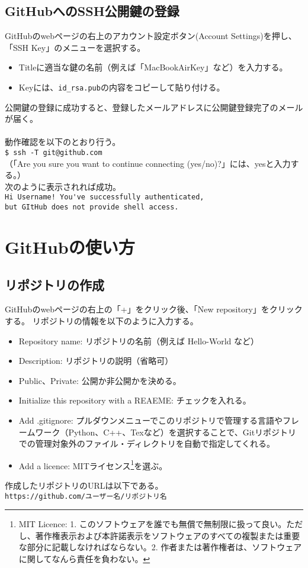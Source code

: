 \documentclass[11pt, oneside]{article}   	%
\begin{document}
\subsection{GitHubへのSSH公開鍵の登録}
GitHubのwebページの右上のアカウント設定ボタン(Account Settings)を押し、「SSH Key」のメニューを選択する。
\begin {itemize}
\item Titleに適当な鍵の名前（例えば「MacBookAirKey」など）を入力する。
\item Keyには、\verb|id_rsa.pub|の内容をコピーして貼り付ける。
\end{itemize}
公開鍵の登録に成功すると、登録したメールアドレスに公開鍵登録完了のメールが届く。\\ \\
動作確認を以下のとおり行う。\\ 
\verb|$ ssh -T git@github.com|\\
（「Are you sure you want to continue connecting (yes/no)?」には、yesと入力する。）\\
次のように表示されれば成功。\\
\verb|Hi Username! You've successfully authenticated, |\\
\verb|but GItHub does not provide shell access.|\\


\section{GitHubの使い方}
\subsection{リポジトリの作成}
GitHubのwebページの右上の「+」をクリック後、「New repository」をクリックする。
リポジトリの情報を以下のように入力する。
\begin{itemize}
\item Repository name: リポジトリの名前（例えば Hello-World など）
\item Description: リポジトリの説明（省略可）
\item Public、Private: 公開か非公開かを決める。
\item Initialize this repository with a REAEME: チェックを入れる。
\item Add .gitignore: プルダウンメニューでこのリポジトリで管理する言語やフレームワーク（Python、C++、Texなど）を選択することで、Gitリポジトリでの管理対象外のファイル・ディレクトリを自動で指定してくれる。
\item Add a licence: MITライセンス\footnote{MIT Licence: 1. このソフトウェアを誰でも無償で無制限に扱って良い。ただし、著作権表示および本許諾表示をソフトウェアのすべての複製または重要な部分に記載しなければならない。2. 作者または著作権者は、ソフトウェアに関してなんら責任を負わない。}を選ぶ。
\end{itemize}
作成したリポジトリのURLは以下である。\\
\verb|https://github.com/ユーザー名/リポジトリ名|\\
\end{document}
